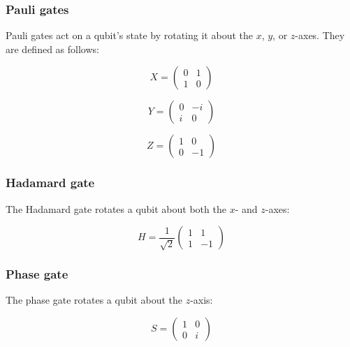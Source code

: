 \documentclass{article}
\begin{document}
\begin{multicols}{2}
\subsubsection{Pauli gates}

Pauli gates act on a qubit’s state by rotating it about the \( x \), \( y \), or \( z \)-axes. They are defined as follows:

\begin{equation}
    X = \begin{pmatrix} 0 & 1 \\ 1 & 0 \end{pmatrix}
\end{equation}

\begin{equation}
    Y = \begin{pmatrix} 0 & -i \\ i & 0 \end{pmatrix}
\end{equation}

\begin{equation}
    Z = \begin{pmatrix} 1 & 0 \\ 0 & -1 \end{pmatrix}
\end{equation}

\subsubsection{Hadamard gate}

The Hadamard gate rotates a qubit about both the \( x \)- and \( z \)-axes:

\begin{equation}
    H = \frac{1}{\sqrt{2}}\begin{pmatrix} 1 & 1 \\ 1 & -1 \end{pmatrix}
\end{equation}

\subsubsection{Phase gate}

The phase gate rotates a qubit about the \( z \)-axis:

\begin{equation}
    S = \begin{pmatrix} 1 & 0 \\ 0 & i \end{pmatrix}
\end{equation}


\end{multicols}
\end{document}
